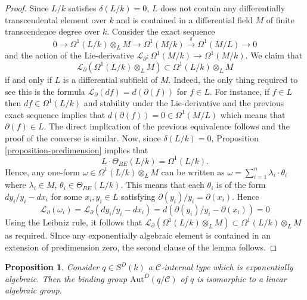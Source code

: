 \documentclass[12pt]{amsart}
\theoremstyle{definition}
\theoremstyle{plain}
\newtheorem{Prop}[defn]{Proposition}
\theoremstyle{exampstyle}\newtheorem{thmx}{Theorem}
\theoremstyle{exampstyle}\newtheorem{thmxbis}{Theorem}
\begin{document}
\begin{proof} 
Since $L/k$ satisfies $\delta(L/k) = 0$, $L$ does not contain any differentially transcendental element over $k$ and is contained in a differential field $M$ of finite transcendence degree over $k$. Consider the exact sequence 
$$ 0 \rightarrow \Omega^1(L/k) \otimes_L M \rightarrow \Omega^1(M/k) \overset{\pi}{\rightarrow} \Omega^1(M/L) \rightarrow 0$$
and the action of the Lie-derivative $\mathcal L_{\partial}: \Omega^1(M /k) \rightarrow \Omega^1(M /k)$. We claim that
$$ \mathcal L_\partial (\Omega^1(L/k) \otimes_L M ) \subset \Omega^1(L/k) \otimes_L M$$
if and only if  $L$ is a differential subfield of $M$.
Indeed, the only thing required to see this is the formula $\mathcal L_\partial (df) = d(\partial(f))$ for $f \in L$. For instance, if $f \in L$ then $df \in \Omega^1(L/k)$ and stability under the Lie-derivative and the previous exact sequence implies that $d(\partial(f)) = 0 \in \Omega^1(M/L)$ which means that $\partial(f) \in L$. The direct implication of the previous equivalence follows and the proof of the converse is similar. Now, since $\delta(L/k) = 0$, Proposition \ref{proposition-predimension} implies that 
\begin{equation}\label{equation-expalg}
L \cdot \Theta_{BE}(L/k) = \Omega^1(L/k).
\end{equation}
Hence, any one-form $\omega \in \Omega^1(L/k) \otimes_L M$ can be written as 
$\omega = \sum_{i = 1}^n \lambda_i \cdot \theta_i$
where $\lambda_i \in M$, $\theta_i \in \Theta_{BE}(L/k)$. This means that each $\theta_i$ is of the form $dy_i/y_i - dx_i$ for some $x_i,y_i \in L$ satisfying $\partial(y_i)/y_i = \partial(x_i)$. Hence
$$\mathcal L_\partial(\omega_i) = \mathcal L_\partial(dy_i/y_i - dx_i) = d (\partial(y_i)/y_i - \partial(x_i)) = 0 $$
Using the Leibniz rule, it follows that $\mathcal L_\partial (\Omega^1(L/k) \otimes_L M ) \subset \Omega^1(L/k) \otimes_L M$ as required. SInce any exponentially algebraic element is contained in an extension of predimension zero, the second clause of the lemma follows.
\end{proof} 







\begin{Prop}\label{proposition2-linear}
Consider $q \in S^D(k)$ a $\mathcal C$-internal type which is exponentially algebraic. Then the binding group $\mathrm{Aut}^D(q/\mathcal C)$ of $q$ is isomorphic to a linear algebraic group. 
\end{Prop} 
\end{document}

